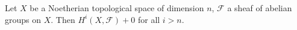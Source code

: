 Let $X$ be a Noetherian topological space of dimension $n$, $\mathcal{F}$ a sheaf
of abelian groups on $X$. Then $H^i(X, \mathcal{F}) + 0$ for all $i > n$.
